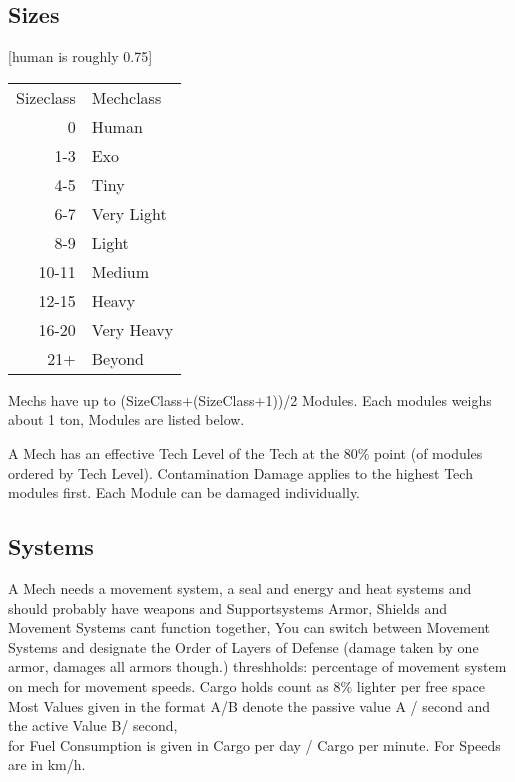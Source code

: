 \subsection{Sizes}
[human is roughly 0.75]\par
\begin{tabular}{r|l}
    Sizeclass &Mechclass \\
      0 &Human\\
    1-3 &Exo\\
    4-5 &Tiny\\
    6-7 &Very Light\\
    8-9 &Light\\
    10-11 &Medium\\
    12-15 &Heavy\\
    16-20 &Very Heavy\\
    21+ &Beyond\\
\end{tabular}\newline
Mechs have up to (SizeClass+(SizeClass+1))/2 Modules.
Each modules weighs about 1 ton, Modules are listed below. \par
A Mech has an effective Tech Level of the Tech at the 80\% point (of modules ordered by Tech Level).\newline
Contamination Damage applies to the highest Tech modules first.
Each Module can be damaged individually.\newline
\newline
\subsection{Systems}
A Mech needs a movement system, a seal and energy and heat systems and should probably have weapons and Supportsystems\newline
Armor, Shields and Movement Systems cant function together, You can switch between Movement Systems and designate the
Order of Layers of Defense (damage taken by one armor, damages all armors though.)
threshholds: percentage of movement system on mech for movement speeds.
Cargo holds count as 8\% lighter per
free space\newline
Most Values given in the format A/B denote the passive value A / second and the active Value B/ second, \\
for Fuel Consumption is given in Cargo per day / Cargo per minute.
For Speeds are in km/h.
